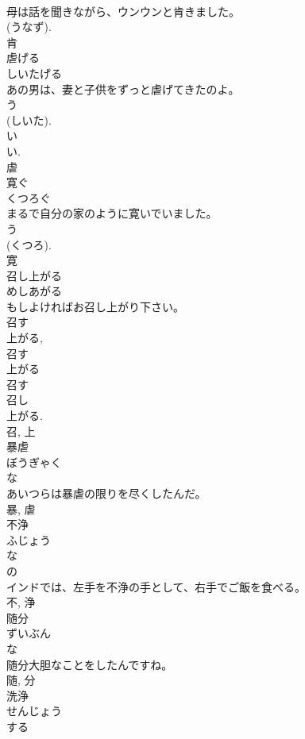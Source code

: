 \documentclass[8pt]{extreport}
\begin{document}
\begin{CJK}{UTF8}{min}
\\	母は話を聞きながら、ウンウンと肯きました。	
\\	(うなず). 
\\	肯	
\\	虐げる	
\\	しいたげる	
\\	あの男は、妻と子供をずっと虐げてきたのよ。	
\\	う 
\\	(しいた). 
\\	い 
\\	い. 
\\	虐	
\\	寛ぐ	
\\	くつろぐ	
\\	まるで自分の家のように寛いでいました。	
\\	う 
\\	(くつろ). 
\\	寛	
\\	召し上がる	
\\	めしあがる	
\\	もしよければお召し上がり下さい。	
\\	召す 
\\	上がる, 
\\	召す 
\\	上がる 
\\	召す 
\\	召し 
\\	上がる. 
\\	召, 上	
\\	暴虐	
\\	ぼうぎゃく	
\\	な 
\\	あいつらは暴虐の限りを尽くしたんだ。	
\\	暴, 虐	
\\	不浄	
\\	ふじょう	
\\	な 
\\	の 
\\	インドでは、左手を不浄の手として、右手でご飯を食べる。	
\\	不, 浄	
\\	随分	
\\	ずいぶん	
\\	な 
\\	随分大胆なことをしたんですね。	
\\	随, 分	
\\	洗浄	
\\	せんじょう	
\\	する 

\end{CJK}
\end{document}
